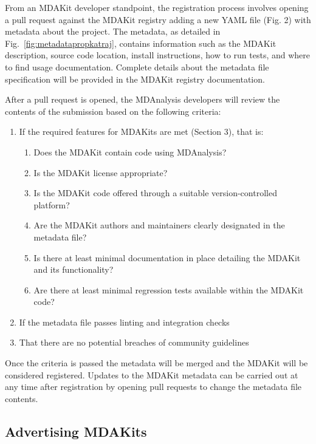 \documentclass{article}
\begin{document}
From an MDAKit developer standpoint, the registration process involves opening a pull request against the MDAKit registry adding a new YAML file (Fig. 2) with metadata about the project. The metadata, as detailed in Fig.~\ref{fig:metadatapropkatraj}, contains information such as the MDAKit description, source code location, install instructions, how to run tests, and where to find usage documentation. Complete details about the metadata file specification will be provided in the MDAKit registry documentation.

After a pull request is opened, the MDAnalysis developers will review the contents of the submission based on the following criteria:
\begin{enumerate}
    \item If the required features for MDAKits are met (Section 3), that is:
    \begin{enumerate}
        \item Does the MDAKit contain code using MDAnalysis?
        \item Is the MDAKit license appropriate?
        \item Is the MDAKit code offered through a suitable version-controlled platform?
        \item Are the MDAKit authors and maintainers clearly designated in the metadata file?
        \item Is there at least minimal documentation in place detailing the MDAKit and its functionality?
        \item Are there at least minimal regression tests available within the MDAKit code?
    \end{enumerate}
    \item If the metadata file passes linting and integration checks
    \item That there are no potential breaches of community guidelines
\end{enumerate}
Once the criteria is passed the metadata will be merged and the MDAKit will be considered registered. Updates to the MDAKit metadata can be carried out at any time after registration by opening pull requests to change the metadata file contents.

\subsection{Advertising MDAKits}
\end{document}
